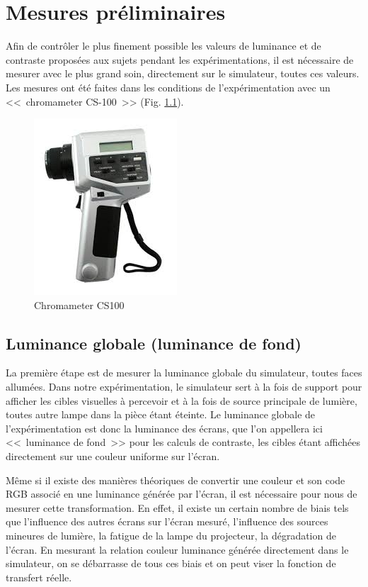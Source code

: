 \chapter{Mesures préliminaires}
\par Afin de contrôler le plus finement possible les valeurs de luminance et de contraste proposées aux sujets pendant les expérimentations, il est nécessaire de mesurer avec le plus grand soin, directement sur le simulateur, toutes ces valeurs. Les mesures ont été faites dans les conditions de l'expérimentation avec un <<~chromameter CS-100~>> (Fig. \ref{fig:chromameter_cs100}).

\begin{figure}
	\centering
	\includegraphics[scale=1]{Figures/ChromameterCS100}
	\caption{Chromameter CS100}
	\label{fig:chromameter_cs100}
\end{figure}
	
	\section{Luminance globale (luminance de fond)}
	\par La première étape est de mesurer la luminance globale du simulateur, toutes faces allumées. Dans notre expérimentation, le simulateur sert à la fois de support pour afficher les cibles visuelles à percevoir et à la fois de source principale de lumière, toutes autre lampe dans la pièce étant éteinte. Le luminance globale de l'expérimentation est donc la luminance des écrans, que l'on appellera ici <<~luminance de fond~>> pour les calculs de contraste, les cibles étant affichées directement sur une couleur uniforme sur l'écran.
	
	\par Même si il existe des manières théoriques de convertir une couleur et son code RGB associé en une luminance générée par l'écran, il est nécessaire pour nous de mesurer cette transformation. En effet, il existe un certain nombre de biais tels que l'influence des autres écrans sur l'écran mesuré, l'influence des sources mineures de lumière, la fatigue de la lampe du projecteur, la dégradation de l'écran. En mesurant la relation couleur luminance générée directement dans le simulateur, on se débarrasse de tous ces biais et on peut viser la fonction de transfert réelle.
	
